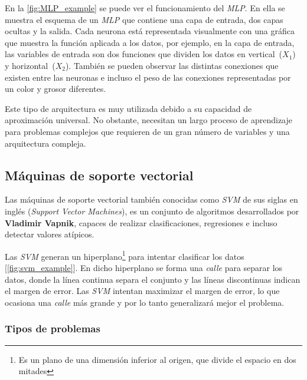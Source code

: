 En la \cref{fig:MLP_example} se puede ver el funcionamiento del \textit{MLP}. En ella se muestra el esquema de un \textit{MLP} que contiene una capa de entrada, dos capas ocultas y la salida.
Cada neurona está representada visualmente con una gráfica que muestra la función aplicada a los datos, por ejemplo, en la capa de entrada, las variables de entrada son dos funciones que dividen los datos en vertical~($X_1$) y horizontal~($X_2$). También se pueden observar las distintas conexiones que existen entre las neuronas e incluso el peso de las conexiones representadas por un color y grosor diferentes.


Este tipo de arquitectura es muy utilizada debido a su capacidad de aproximación universal. No obstante, necesitan un largo proceso de aprendizaje para problemas complejos que requieren de un gran número de variables y una arquitectura compleja.




\subsection[Máquinas de soporte vectorial]{Máquinas de soporte vectorial~\cite{berwick2003idiot}}
\label{sec:svm}
Las máquinas de soporte vectorial también conocidas como \textit{SVM} de sus siglas en inglés (\textit{Support Vector Machines}), es un conjunto de algoritmos desarrollados por \textbf{Vladimir Vapnik}, capaces de realizar clasificaciones, regresiones e incluso detectar valores atípicos.


Las \textit{SVM} generan un hiperplano\footnote{Es un plano de una dimensión inferior al origen, que divide el espacio en dos mitades} para intentar clasificar los datos [\cref{fig:svm_example}]. En dicho hiperplano se forma una \textit{calle} para separar los datos, donde la línea continua separa el conjunto y las líneas discontinuas indican el margen de error. Las \textit{SVM} intentan maximizar el margen de error, lo que ocasiona una \textit{calle} más grande y por lo tanto generalizará mejor el problema.



\subsubsection{Tipos de problemas}

